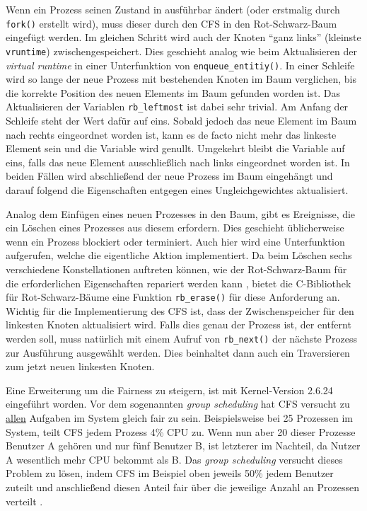 Wenn ein Prozess seinen Zustand in ausführbar ändert (oder erstmalig durch \texttt{fork()} erstellt wird), muss dieser durch den CFS in den Rot-Schwarz-Baum eingefügt werden. Im gleichen Schritt wird auch der Knoten ``ganz links'' (kleinste \texttt{vruntime}) zwischengespeichert. Dies geschieht analog wie beim Aktualisieren der \textit{virtual runtime} in einer Unterfunktion von \texttt{enqueue\_entitiy()}. In einer Schleife wird so lange der neue Prozess mit bestehenden Knoten im Baum verglichen, bis die korrekte Position des neuen Elements im Baum gefunden worden ist. Das Aktualisieren der Variablen \texttt{rb\_leftmost} ist dabei sehr trivial. Am Anfang der Schleife steht der Wert dafür auf eins. Sobald jedoch das neue Element im Baum nach rechts eingeordnet worden ist, kann es de facto nicht mehr das linkeste Element sein und die Variable wird genullt. Umgekehrt bleibt die Variable auf eins, falls das neue Element ausschließlich nach links eingeordnet worden ist. 
In beiden Fällen wird abschließend der neue Prozess im Baum eingehängt und darauf folgend die Eigenschaften entgegen eines Ungleichgewichtes aktualisiert.

Analog dem Einfügen eines neuen Prozesses in den Baum, gibt es Ereignisse, die ein Löschen eines Prozesses aus diesem erfordern. Dies geschieht üblicherweise wenn ein Prozess blockiert oder terminiert. Auch hier wird eine Unterfunktion aufgerufen, welche die eigentliche Aktion implementiert.
Da beim Löschen sechs verschiedene Konstellationen auftreten können, wie der Rot-Schwarz-Baum für die erforderlichen Eigenschaften repariert werden kann \cite{tcormen}, bietet die C-Bibliothek für Rot-Schwarz-Bäume eine Funktion  \texttt{rb\_erase()} für diese Anforderung an. Wichtig für die Implementierung des CFS ist, dass der Zwischenspeicher für den linkesten Knoten aktualisiert wird. Falls dies genau der Prozess ist, der entfernt werden soll, muss natür\-lich mit einem Aufruf von \texttt{rb\-\_next()} der näch\-ste Prozess zur Ausführung ausgewählt werden. Dies beinhaltet dann auch ein Traversieren zum jetzt neuen linkesten Knoten.


Eine Erweiterung um die Fairness zu steigern, ist mit Ker\-nel-Version 2.6.24 eingeführt worden. Vor dem sogenannten \textit{group scheduling} hat CFS versucht zu \underline{allen} Aufgaben im System gleich fair zu sein. Beispielsweise bei 25 Prozessen im System, teilt CFS jedem Prozess 4\% CPU zu. Wenn nun aber 20 dieser Prozesse Benutzer A gehören und nur fünf Benutzer B, ist letzterer im Nachteil, da Nutzer A wesentlich mehr CPU bekommt als B. Das \textit{group scheduling} versucht dieses Problem zu lösen, indem CFS im Beispiel oben jeweils 50\% jedem Benutzer zuteilt und anschließend diesen Anteil fair über die jeweilige Anzahl an Prozessen verteilt \cite{cpabla}. 
